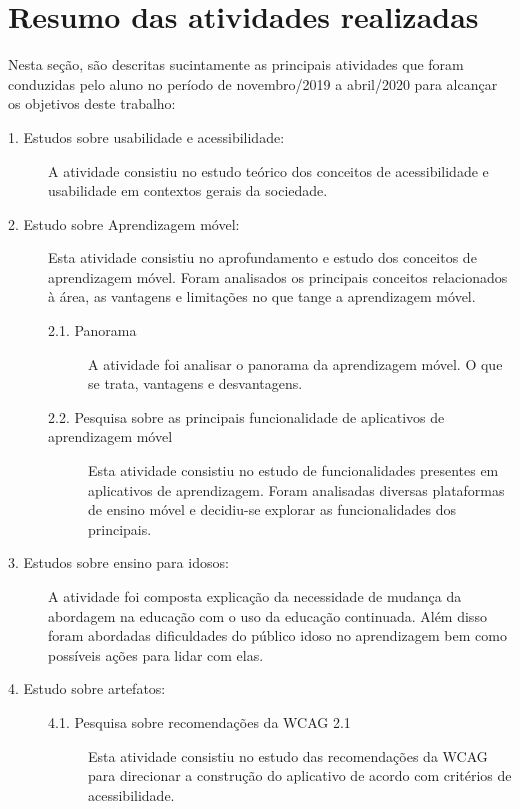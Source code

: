 \chapter{Resumo das atividades realizadas} \label{sec:resumo_ativ}
Nesta seção, são descritas sucintamente as principais atividades que foram conduzidas pelo aluno no período de novembro/2019 a abril/2020 para alcançar os objetivos deste trabalho:

\begin{description}
\item[1. Estudos sobre usabilidade e acessibilidade:]
A atividade consistiu no estudo teórico dos conceitos de acessibilidade e usabilidade em contextos gerais da sociedade.

\item[2. Estudo sobre Aprendizagem móvel:] Esta atividade consistiu no aprofundamento e estudo dos conceitos de aprendizagem móvel. Foram analisados os principais conceitos relacionados à área, as vantagens e limitações no que tange a aprendizagem móvel. 

\begin{description}
    \item[2.1. Panorama]
    A atividade foi analisar o panorama da aprendizagem móvel. O que se trata, vantagens e desvantagens.
    
    \item[2.2. Pesquisa sobre as principais funcionalidade de aplicativos de aprendizagem móvel]
    Esta atividade consistiu no estudo de funcionalidades presentes em aplicativos de aprendizagem. Foram analisadas diversas plataformas de ensino móvel e decidiu-se explorar as funcionalidades dos principais.
\end{description}

\item[3. Estudos sobre ensino para idosos:]
A atividade foi composta explicação da necessidade de mudança da abordagem na educação com o uso da educação continuada. Além disso foram abordadas dificuldades do público idoso no aprendizagem bem como possíveis ações para lidar com elas.

\item[4. Estudo sobre artefatos:]
\hfill

\begin{description}
    \item[4.1. Pesquisa sobre recomendações da WCAG 2.1]
    Esta atividade consistiu no estudo das recomendações da WCAG para direcionar a construção do aplicativo de acordo com critérios de acessibilidade.
    

\end{description}
\end{description}
